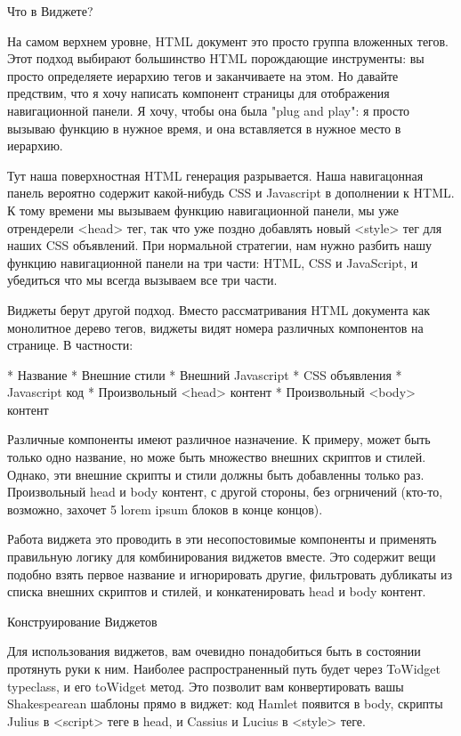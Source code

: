 Что в Виджете?

На самом верхнем уровне, HTML документ это просто группа вложенных тегов. Этот подход выбирают большинство HTML порождающие инструменты: вы просто определяете иерархию тегов и заканчиваете на этом. Но давайте предствим, что я хочу написать компонент страницы для отображения навигационной панели. Я хочу, чтобы она была "plug and play": я просто вызываю функцию в нужное время, и она вставляется в нужное место в иерархию.

Тут наша поверхностная HTML генерация разрывается. Наша навигацонная панель вероятно содержит какой-нибудь CSS и Javascript в дополнении к HTML. К тому времени мы вызываем функцию навигационной панели, мы уже отрендерели <head> тег, так что уже поздно добавлять новый <style> тег для наших CSS объявлений. При нормальной стратегии, нам нужно разбить нашу функцию навигационной панели на три части: HTML, CSS и JavaScript, и убедиться что мы всегда вызываем все три части.  

Виджеты берут другой подход. Вместо рассматривания HTML документа как монолитное дерево тегов, виджеты видят номера различных компонентов на странице. В частности:

* Название
* Внешние стили
* Внешний Javascript
* CSS объявления
* Javascript код
* Произвольный <head> контент
* Произвольный <body> контент

Различные компоненты имеют различное назначение. К примеру, может быть только одно название, но може быть множество внешних скриптов и стилей. Однако, эти внешние скрипты и стили должны быть добавленны только раз. Произвольный head и body контент, с другой стороны, без огрничений (кто-то, возможно, захочет 5 lorem ipsum блоков в конце концов).

Работа виджета это проводить в эти несопостовимые компоненты и применять правильную логику для комбинирования виджетов вместе. Это содержит вещи подобно взять первое название и игнорировать другие, фильтровать дубликаты из списка внешних скриптов и стилей, и конкатенировать head и body контент.

Конструирование Виджетов

Для использования виджетов, вам очевидно понадобиться быть в состоянии протянуть руки к ним. Наиболее распространенный путь будет через ToWidget typeclass, и его toWidget метод. Это позволит вам конвертировать вашы Shakespearean шаблоны прямо в виджет: код Hamlet появится в body, скрипты Julius в <script> теге в head, и Cassius и Lucius в <style> теге.

